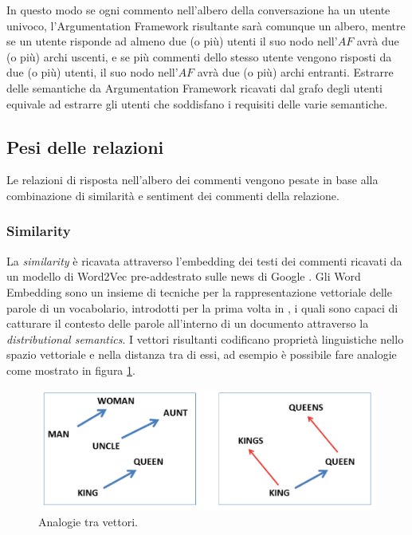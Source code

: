 In questo modo se ogni commento nell'albero della conversazione ha un utente univoco, l'Argumentation Framework risultante sarà comunque un albero, mentre se un utente risponde ad almeno due (o più) utenti il suo nodo nell'$AF$ avrà due (o più) archi uscenti, e se più commenti dello stesso utente vengono risposti da due (o più) utenti, il suo nodo nell'$AF$ avrà due (o più) archi entranti.
Estrarre delle semantiche da Argumentation Framework ricavati dal grafo degli utenti equivale ad estrarre gli utenti che soddisfano i requisiti delle varie semantiche.

\subsection{Pesi delle relazioni}
\label{subsection:weight}
Le relazioni di risposta nell'albero dei commenti vengono pesate in base alla combinazione di similarità e sentiment dei commenti della relazione.

\subsubsection{Similarity}
La \textit{similarity} è ricavata attraverso l'embedding dei testi dei commenti ricavati da un modello di Word2Vec pre-addestrato sulle news di Google \cite{googlenewsmodel}. Gli Word Embedding sono un insieme di tecniche per la rappresentazione vettoriale delle parole di un vocabolario, introdotti per la prima volta in \cite{mikolov2013distributed}, i quali sono capaci di catturare il contesto delle parole all'interno di un documento attraverso la \textit{distributional semantics}. I vettori risultanti codificano proprietà linguistiche nello spazio vettoriale e nella distanza tra di essi, ad esempio è possibile fare analogie come mostrato in figura \ref{fig:analogy}.

\begin{figure}
    \includegraphics[width=\linewidth]{Immagini/king-queen.png}
    \caption{Analogie tra vettori.}
    \label{fig:analogy}
\end{figure}

